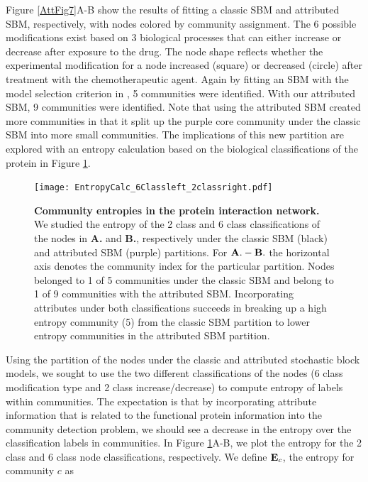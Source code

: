 Figure \ref{AttFig7}A-B show the results of fitting a classic SBM and attributed SBM, respectively, with nodes colored by community assignment. The 6 possible modifications exist based on 3 biological processes that can either increase or decrease after exposure to the drug. The node shape reflects whether the experimental modification for a node increased (square) or decreased (circle) after treatment with the chemotherapeutic agent. Again by fitting an SBM with the model selection criterion in \cite{dudin}, 5 communities were identified. With our attributed SBM, 9 communities were identified. Note that using the attributed SBM created more communities in that it split up the purple core community under the classic SBM into more small communities. The implications of this new partition are explored with an entropy calculation based on the biological classifications of the protein in Figure \ref{entropyFig}.
 \begin{figure}[h!]
\begin{center}
\texttt{[image: EntropyCalc\_6Classleft\_2classright.pdf]}
\caption{{\bf Community entropies in the protein interaction network.} We studied the entropy of the 2 class and 6 class classifications of the nodes in {\bf A.} and {\bf B.}, respectively under the classic SBM (black) and attributed SBM (purple) partitions. For ${\bf A.-B.}$ the horizontal axis denotes the community index for the particular partition. Nodes belonged to 1 of 5 communities under the classic SBM and belong to 1 of 9 communities with the attributed SBM. Incorporating attributes under both classifications succeeds in breaking up a high entropy community (5) from the classic SBM partition to lower entropy communities in the attributed SBM partition. }
\label{entropyFig} %
\end{center}
\end{figure}

Using the partition of the nodes under the classic and attributed stochastic block models, we sought to use the two different classifications of the nodes (6 class modification type and 2 class increase/decrease) to compute entropy of labels within communities. The expectation is that by incorporating attribute information that is related to the functional protein information into the community detection problem, we should see a decrease in the entropy over the classification labels in communities. In Figure \ref{entropyFig}A-B, we plot the entropy for the 2 class and 6 class node classifications, respectively. We define ${\bf E}_{c}$, the entropy for community $c$ as

